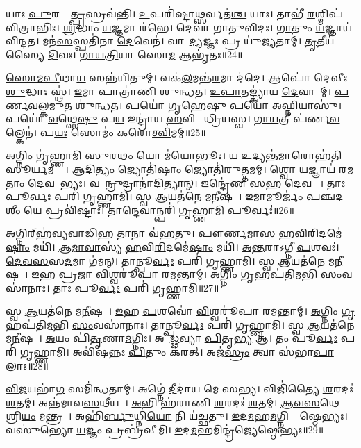 𑌯𑌾𑌃 \ul{𑌪𑍁}𑌰𑌸𑍍𑌤𑌾᳚\ul{𑌤𑍍𑌪𑍍𑌰}𑌸𑍍𑌰𑌵॑𑌨𑍍𑌤𑌿।
\ul{𑌉}𑌪𑌰𑌿॑𑌷𑍍𑌟𑌾\ul{𑌥𑍍𑌸}𑌰𑍍𑌵𑌤॑\ul{𑌶𑍍𑌚} 𑌯𑌾𑌃।
𑌤𑌾𑌭𑍀॑ \ul{𑌰}𑌶𑍍𑌮𑌿𑌪॑𑌵𑌿𑌤𑍍𑌰𑌾𑌭𑌿𑌃।
\ul{𑌶𑍍𑌰}𑌦𑍍𑌧𑌾𑌂 \ul{𑌯}𑌜𑍍𑌞𑌮𑌾 𑌰॑𑌭𑍇।
𑌦𑍇𑌵𑌾॑ 𑌗𑌾𑌤𑍁𑌵𑌿𑌦𑌃।
\ul{𑌗𑌾}𑌤𑍁𑌂 \ul{𑌯}𑌜𑍍𑌞𑌾𑌯॑ 𑌵𑌿𑌨𑍍𑌦𑌤।
𑌮𑌨॑\ul{𑌸}𑌸𑍍𑌪𑌤𑌿॑𑌨𑌾 \ul{𑌦𑍇}𑌵𑍇𑌨॑।
𑌵𑌾𑌤𑌾᳚\ul{𑌦𑍍𑌯}𑌜𑍍𑌞𑌃 𑌪𑍍𑌰 𑌯𑍁॑𑌜𑍍𑌯𑌤𑌾𑌮𑍍।
\ul{𑌤𑍃}𑌤𑍀𑌯॑𑌸𑍍𑌯𑍈 \ul{𑌦𑌿}𑌵𑌃।
\ul{𑌗𑌾}\ul{𑌯}\ul{𑌤𑍍𑌰𑌿}𑌯𑌾 𑌸𑍋\ul{𑌮} 𑌆𑌭𑍃॑𑌤𑌃॥24॥

\ul{𑌸𑍋}\ul{𑌮}\ul{𑌪𑍀}𑌥𑌾\ul{𑌯} 𑌸𑌨𑍍𑌨॑𑌯𑌿𑌤𑍁𑌮𑍍।
𑌵𑌕॑\ul{𑌲}𑌮𑌨𑍍𑌤॑\ul{𑌰}𑌮𑌾 𑌦॑𑌦𑍇।
𑌆𑌪𑍋॑ 𑌦𑍇𑌵𑍀𑌃 \ul{𑌶𑍁}𑌦𑍍𑌧𑌾𑌃 𑌸𑍍𑌥॑।
\ul{𑌇}𑌮𑌾 𑌪𑌾𑌤𑍍𑌰𑌾॑𑌣𑌿 𑌶𑍁𑌨𑍍𑌧𑌤।
\ul{𑌉}\ul{𑌪𑌾}\ul{𑌤}𑌙𑍍𑌕𑍍𑌯𑌾॑𑌯 \ul{𑌦𑍇}𑌵𑌾𑌨𑌾᳚𑌮𑍍।
\ul{𑌪}\ul{𑌰𑍍𑌣}\ul{𑌵}𑌲𑍍𑌕\ul{𑌮𑍁}𑌤 𑌶𑍁॑𑌨𑍍𑌧𑌤।
𑌪𑌯𑍋॑ \ul{𑌗𑍃}𑌹𑍇\ul{𑌷𑍁} 𑌪𑌯𑍋॑ 𑌅\ul{𑌘𑍍𑌨𑌿}𑌯𑌾𑌸𑍁॑।
𑌪𑌯𑍋॑ \ul{𑌵}𑌥𑍍𑌸𑍇\ul{𑌷𑍁} 𑌪\ul{𑌯} 𑌇𑌨𑍍𑌦𑍍𑌰𑌾॑𑌯 \ul{𑌹}𑌵𑌿𑌷𑍇᳚ 𑌧𑍍𑌰𑌿𑌯𑌸𑍍𑌵।
\ul{𑌗𑌾}\ul{𑌯}𑌤𑍍𑌰𑍀 𑌪॑𑌰𑍍𑌣\ul{𑌵}𑌲𑍍𑌕𑍇𑌨॑।
𑌪\ul{𑌯𑌃} 𑌸𑍋𑌮𑌂॑ 𑌕𑌰𑍋\ul{𑌤𑍍𑌵𑌿}𑌮𑌮𑍍॥25॥

\ul{𑌅}𑌗𑍍𑌨𑌿𑌂 𑌗𑍃॑𑌹𑍍𑌣𑌾𑌮𑌿 \ul{𑌸𑍁}𑌰\ul{𑌥𑌂} 𑌯𑍋 𑌮॑\ul{𑌯𑍋}𑌭𑍂𑌃।
𑌯 \ul{𑌉}𑌦𑍍𑌯𑌨𑍍𑌤॑\ul{𑌮𑌾}𑌰𑍋𑌹॑\ul{𑌤𑌿} 𑌸𑍂\ul{𑌰𑍍𑌯}𑌮𑌹𑍍𑌨𑍇᳚।
\ul{𑌆}\ul{𑌦𑌿}𑌤𑍍𑌯𑌂 𑌜𑍍𑌯𑍋𑌤𑌿॑\ul{𑌷𑌾𑌂} 𑌜𑍍𑌯𑍋𑌤𑌿॑𑌰𑍁\ul{𑌤𑍍𑌤}𑌮𑌮𑍍।
𑌶𑍍𑌵𑍋 \ul{𑌯}𑌜𑍍𑌞𑌾𑌯॑ 𑌰𑌮𑌤𑌾𑌂 \ul{𑌦𑍇}𑌵𑌤𑌾᳚𑌭𑍍𑌯𑌃।
𑌵𑌸𑍂᳚\ul{𑌨𑍍𑌰𑍁}𑌦𑍍𑌰𑌾𑌨𑌾॑\ul{𑌦𑌿}𑌤𑍍𑌯𑌾𑌨𑍍।
𑌇𑌨𑍍𑌦𑍍𑌰𑍇॑𑌣 \ul{𑌸}𑌹 \ul{𑌦𑍇}𑌵𑌤𑌾𑌃᳚।
𑌤𑌾𑌃 𑌪𑍂\ul{𑌰𑍍𑌵𑌃} 𑌪𑌰𑌿॑ 𑌗𑍃𑌹𑍍𑌣𑌾𑌮𑌿।
𑌸𑍍𑌵 \ul{𑌆}𑌯𑌤॑𑌨𑍇 𑌮\ul{𑌨𑍀}𑌷𑌯𑌾᳚।
\ul{𑌇}𑌮𑌾𑌮𑍂𑌰𑍍𑌜𑌂॑ 𑌪𑌞𑍍𑌚\ul{𑌦}𑌶𑍀𑌂 𑌯𑍇 𑌪𑍍𑌰𑌵𑌿॑𑌷𑍍𑌟𑌾𑌃।
𑌤𑌾\ul{𑌨𑍍𑌦𑍇}𑌵𑌾𑌨𑍍𑌪𑌰𑌿॑ 𑌗𑍃𑌹𑍍𑌣𑌾\ul{𑌮𑌿} 𑌪𑍂𑌰𑍍𑌵𑌃॑॥26॥

\ul{𑌅}𑌗𑍍𑌨𑌿𑌰𑍍‌\mbox{}𑌹॑\ul{𑌵𑍍𑌯}𑌵𑌾\ul{𑌡𑌿}𑌹 𑌤𑌾𑌨𑌾 𑌵॑𑌹𑌤𑍁।
\ul{𑌪𑍗}\ul{𑌰𑍍𑌣}\ul{𑌮𑌾}𑌸 \ul{𑌹}𑌵𑌿\ul{𑌰𑌿}𑌦𑌮𑍇॑\ul{𑌷𑌾𑌂} 𑌮𑌯𑌿॑।
\ul{𑌆}\ul{𑌮𑌾}\ul{𑌵𑌾}𑌸𑍍𑌯॑ \ul{𑌹}𑌵𑌿\ul{𑌰𑌿}𑌦𑌮𑍇॑\ul{𑌷𑌾𑌂} 𑌮𑌯𑌿॑।
\ul{𑌅}\ul{𑌨𑍍𑌤}𑌰𑌾\-𑌽𑌗𑍍𑌨𑍀 \ul{𑌪}𑌶𑌵𑌃॑।
\ul{𑌦𑍇}\ul{𑌵}\ul{𑌸}\ul{}𑌸\ul{𑌦}𑌮𑌾 𑌗॑𑌮𑌨𑍍।
𑌤𑌾𑌨𑍍𑌪𑍂\ul{𑌰𑍍𑌵𑌃} 𑌪𑌰𑌿॑ 𑌗𑍃𑌹𑍍𑌣𑌾𑌮𑌿।
𑌸𑍍𑌵 \ul{𑌆}𑌯𑌤॑𑌨𑍇 𑌮\ul{𑌨𑍀}𑌷𑌯𑌾᳚।
\ul{𑌇}𑌹 \ul{𑌪𑍍𑌰}𑌜𑌾 \ul{𑌵𑌿}𑌶𑍍𑌵𑌰𑍂॑𑌪𑌾 𑌰𑌮𑌨𑍍𑌤𑌾𑌮𑍍।
\ul{𑌅}𑌗𑍍𑌨𑌿𑌂 \ul{𑌗𑍃}𑌹𑌪॑𑌤𑌿\ul{𑌮}𑌭𑌿 \ul{𑌸𑌂}𑌵𑌸𑌾॑𑌨𑌾𑌃।
𑌤𑌾𑌃 𑌪𑍂\ul{𑌰𑍍𑌵𑌃} 𑌪𑌰𑌿॑ 𑌗𑍃𑌹𑍍𑌣𑌾𑌮𑌿॥27॥

𑌸𑍍𑌵 \ul{𑌆}𑌯𑌤॑𑌨𑍇 𑌮\ul{𑌨𑍀}𑌷𑌯𑌾᳚।
\ul{𑌇}𑌹 \ul{𑌪}𑌶𑌵𑍋॑ \ul{𑌵𑌿}𑌶𑍍𑌵𑌰𑍂॑𑌪𑌾 𑌰𑌮𑌨𑍍𑌤𑌾𑌮𑍍।
\ul{𑌅}𑌗𑍍𑌨𑌿𑌂 \ul{𑌗𑍃}𑌹𑌪॑𑌤𑌿\ul{𑌮}𑌭𑌿 \ul{𑌸𑌂}𑌵𑌸𑌾॑𑌨𑌾𑌃।
𑌤𑌾𑌨𑍍𑌪𑍂\ul{𑌰𑍍𑌵𑌃} 𑌪𑌰𑌿॑ 𑌗𑍃𑌹𑍍𑌣𑌾𑌮𑌿।
𑌸𑍍𑌵 \ul{𑌆}𑌯𑌤॑𑌨𑍇 𑌮\ul{𑌨𑍀}𑌷𑌯𑌾᳚।
\ul{𑌅}𑌯𑌂 𑌪𑌿॑\ul{𑌤𑍃}𑌣𑌾\ul{𑌮}𑌗𑍍𑌨𑌿𑌃।
𑌅𑌵𑌾᳚\ul{𑌡𑍍𑌢}𑌵𑍍𑌯𑌾 \ul{𑌪𑌿}𑌤𑍃\ul{𑌭𑍍𑌯} 𑌆।
𑌤𑌂 𑌪𑍂\ul{𑌰𑍍𑌵𑌃} 𑌪𑌰𑌿॑ 𑌗𑍃𑌹𑍍𑌣𑌾𑌮𑌿।
𑌅𑌵𑌿॑𑌷𑌨𑍍𑌨𑌃 \ul{𑌪𑌿}𑌤𑍁𑌂 𑌕॑𑌰𑌤𑍍।
𑌅𑌜॑\ul{𑌸𑍍𑌰𑌂} 𑌤𑍍𑌵𑌾 𑌸॑𑌭𑌾\ul{𑌪𑌾}𑌲𑌾𑌃॥28॥

\ul{𑌵𑌿}\ul{𑌜}𑌯𑌭𑌾॑\ul{𑌗}\ul{} 𑌸𑌮𑌿॑𑌨𑍍𑌧𑌤𑌾𑌮𑍍।
𑌅𑌗𑍍𑌨𑍇॑ \ul{𑌦𑍀}𑌦𑌾॑𑌯 𑌮𑍇 𑌸𑌭𑍍𑌯।
𑌵𑌿𑌜𑌿॑𑌤𑍍𑌯𑍈 \ul{𑌶}𑌰𑌦𑌃॑ \ul{𑌶}𑌤𑌮𑍍।
𑌅𑌨𑍍𑌨॑𑌮𑌾𑌵\ul{𑌸}𑌥𑍀𑌯𑌮𑍍᳚।
\ul{𑌅}𑌭𑌿 𑌹॑𑌰𑌾𑌣𑌿 \ul{𑌶}𑌰𑌦𑌃॑ \ul{𑌶}𑌤𑌮𑍍।
\ul{𑌆}\ul{𑌵}\ul{𑌸}𑌥𑍇 𑌶𑍍𑌰𑌿\ul{𑌯𑌂} 𑌮𑌨𑍍𑌤𑍍𑌰𑌮𑍍᳚।
𑌅𑌹𑌿॑\ul{𑌰𑍍𑌬𑍁}𑌧𑍍𑌨𑌿\ul{𑌯𑍋} 𑌨𑌿 𑌯॑𑌚𑍍𑌛𑌤𑍁।
\ul{𑌇}𑌦\ul{𑌮}𑌹\ul{𑌮}𑌗𑍍𑌨𑌿𑌜𑍍𑌯𑍇᳚𑌷𑍍𑌠𑍇𑌭𑍍𑌯𑌃।
𑌵𑌸𑍁॑𑌭𑍍𑌯𑍋 \ul{𑌯}𑌜𑍍𑌞𑌂 𑌪𑍍𑌰𑌬𑍍𑌰॑𑌵𑍀𑌮𑌿।
\ul{𑌇}𑌦\ul{𑌮}𑌹𑌮𑌿𑌨𑍍𑌦𑍍𑌰॑𑌜𑍍𑌯𑍇𑌷𑍍𑌠𑍇𑌭𑍍𑌯𑌃॥29॥


